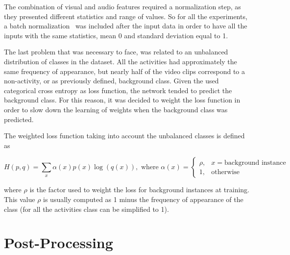 The combination of visual and audio features required a normalization step, as they presented different statistics and range of values.
So for all the experiments, a batch normalization~\cite{ioffe2015batch} was included after the input data in order to have all the inputs with the same statistics, mean 0 and standard deviation equal to 1.

The last problem that was necessary to face, was related to an unbalanced distribution of classes in the dataset. All the activities had approximately the same frequency of appearance, but nearly half of the video clips correspond to a non-activity, or as previously defined, background class.
Given the used categorical cross entropy as loss function, the network tended to predict the background class. For this reason, it was decided to weight the loss function in order to slow down the learning of weights when the background class was predicted. %

The weighted loss function taking into account the unbalanced classes is defined as

\begin{equation}
	H(p,q) = \sum_x \alpha(x) p(x) \log (q(x)), \text{ where } \alpha(x) =
    \begin{cases}
        \rho, & x = \text{background instance}\\
        1,    & \text{otherwise}
    \end{cases}
\end{equation}

where $\rho$ is the factor used to weight the loss for background instances at training. This value $\rho$ is usually computed as 1 minus the frequency of appearance of the class (for all the activities class can be simplified to 1). %

\section{Post-Processing}
\label{section:post_processing}

